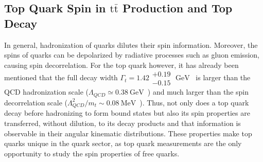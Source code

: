 \begin{refsection}
\section{Top Quark Spin in \ensuremath{\mathrm{t\bar{t}}} Production and Top Decay}
\label{Top_Quark_Spin_in_ttbar_Production_and_Top_Decay}
In general, hadronization of quarks dilutes their spin information.
Moreover, the spins of quarks can be depolarized by radiative processes such as gluon emission, causing spin decorrelation.
For the top quark however, it has already been mentioned that the full decay width $\Gamma_t = 1.42 \substack{+0.19 \\ -0.15} \; \si{\GeV}$~\cite{bib:PDG} is larger than the QCD hadronization scale ($\Lambda_{QCD} \simeq \SI{0.38}{\GeV}$~\cite{Groote_1998}) and much larger than the spin decorrelation scale ($\Lambda_{QCD}^2/m_t \sim \SI{0.08}{\MeV}$~\cite{Stelzer_1996}).
Thus, not only does a top quark decay before hadronizing to form bound states but also its spin properties are transferred, without dilution, to its decay products and that information is observable in their angular kinematic distributions.
These properties make top quarks unique in the quark sector, as top quark measurements are the only opportunity to study the spin properties of free quarks.


\end{refsection}
